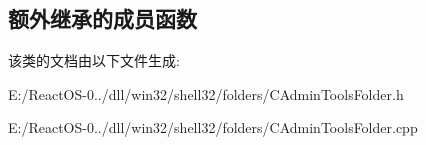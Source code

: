 \subsection*{额外继承的成员函数}


该类的文档由以下文件生成\+:\begin{DoxyCompactItemize}
\item 
E\+:/\+React\+O\+S-\/0../dll/win32/shell32/folders/C\+Admin\+Tools\+Folder.\+h\item 
E\+:/\+React\+O\+S-\/0../dll/win32/shell32/folders/C\+Admin\+Tools\+Folder.\+cpp\end{DoxyCompactItemize}
